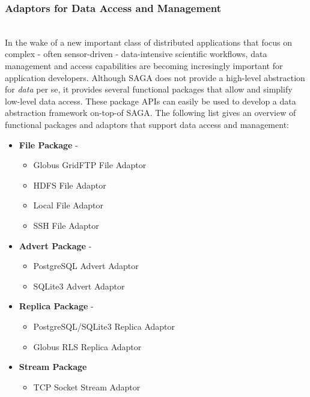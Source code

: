   \subsubsection{Adaptors for Data Access and Management} 
  \\
  In the wake of a new important class of distributed applications that focus
  on complex - often sensor-driven - data-intensive scientific workflows, data
  management and access capabilities are becoming incresingly important for
  application developers. Although SAGA does not provide a high-level
  abstraction for \textit{data} per se, it provides several functional packages
  that allow and simplify low-level data access. These package APIs can easily
  be used to develop a data abstraction framework on-top-of SAGA. The following
  list gives an overview of functional packages and adaptors that support data
  access and management:
    
    \begin{itemize}
    
    \item \textbf{File Package} - 
    
    \begin{itemize}
    \item Globus GridFTP File Adaptor
    \item HDFS File Adaptor
    \item Local File Adaptor
    \item SSH File Adaptor
    
    \end{itemize}
    
    \item \textbf{Advert Package} - 
    
    \begin{itemize}
    \item PostgreSQL Advert Adaptor
    \item SQLite3 Advert Adaptor
    \end{itemize}
    
    \item \textbf{Replica Package} - 
    
    \begin{itemize}
    \item PostgreSQL/SQLite3 Replica Adaptor
    \item Globus RLS Replica Adaptor
    \end{itemize}
    
    \item \textbf{Stream Package}
    
    \begin{itemize}
    \item TCP Socket Stream Adaptor
    \end{itemize}
    
    \end{itemize}
 

